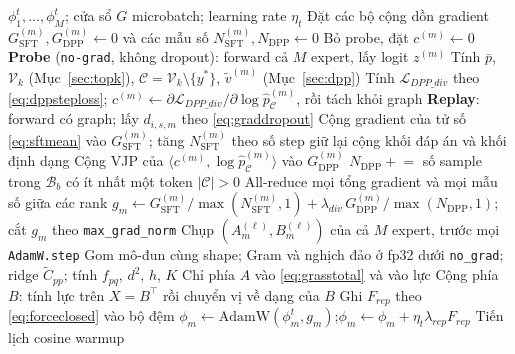 \documentclass[12pt,a4paper]{article}
\theoremstyle{plain}
\newcommand{\Vk}{\mathcal V_k}
\newcommand{\Cset}{\mathcal C}
\newcommand{\ytar}{y^{*}}
\begin{document}
\begin{algorithm}[H]
\caption{Một bước optimizer của Phase 1 (chế độ probe)}
\label{alg:phase1step}
\begin{algorithmic}[1]
\Require $\phi_1^t,\dots,\phi_M^t$; cửa sổ $G$ microbatch; learning rate $\eta_t$
\State Đặt các bộ cộng dồn gradient $G^{(m)}_{\mathrm{SFT}},G^{(m)}_{\mathrm{DPP}}\leftarrow0$ và các mẫu số $N^{(m)}_{\mathrm{SFT}},N_{\mathrm{DPP}}\leftarrow0$
        \State Bỏ probe, đặt $c^{(m)}\leftarrow0$
    \Else
        \State \textbf{Probe} (\texttt{no-grad}, không dropout): forward cả $M$ expert, lấy logit $z^{(m)}$
        \State Tính $\bar p$, $\Vk$ (Mục~\ref{sec:topk}), $\Cset=\Vk\setminus\{\ytar\}$, $\tilde v^{(m)}$ (Mục~\ref{sec:dpp})
        \State Tính $\mathcal L_{DPP\_div}$ theo \eqref{eq:dppsteploss}; $c^{(m)}\leftarrow\partial\mathcal L_{DPP\_div}/\partial\log\hat p^{(m)}_{\Cset}$, rồi tách khỏi graph
    \EndIf
        \State \textbf{Replay}: forward có graph; lấy $d_{i,s,m}$ theo \eqref{eq:graddropout}
        \State Cộng gradient của tử số \eqref{eq:sftmean} vào $G^{(m)}_{\mathrm{SFT}}$; tăng $N^{(m)}_{\mathrm{SFT}}$ theo số step giữ lại cộng khối đáp án và khối định dạng
        \State Cộng VJP của $\langle c^{(m)},\log\hat p^{(m)}_{\Cset}\rangle$ vào $G^{(m)}_{\mathrm{DPP}}$
    \EndFor
    \State $N_{\mathrm{DPP}}\mathrel{+}=$ số sample trong $\mathcal B_b$ có ít nhất một token $|\Cset|>0$
\EndFor
\State All-reduce mọi tổng gradient và mọi mẫu số giữa các rank
\State $g_m\leftarrow G^{(m)}_{\mathrm{SFT}}/\max(N^{(m)}_{\mathrm{SFT}},1)+\lambda_{div}\,G^{(m)}_{\mathrm{DPP}}/\max(N_{\mathrm{DPP}},1)$; cắt $g_m$ theo \texttt{max\_grad\_norm}
    \State Chụp $(A_m^{(\ell)},B_m^{(\ell)})$ của cả $M$ expert, trước mọi \texttt{AdamW.step}
    \State Gom mô-đun cùng shape; Gram và nghịch đảo ở fp32 dưới \texttt{no\_grad}; ridge $\tilde C_{pp}$; tính $f_{pq}$, $d^2$, $h$, $K$
        \State Chỉ phía $A$ vào \eqref{eq:grasstotal} và vào lực
    \Else
        \State Cộng phía $B$: tính lực trên $X=B^\top$ rồi chuyển vị về dạng của $B$
    \EndIf
    \State Ghi $F_{rep}$ theo \eqref{eq:forceclosed} vào bộ đệm
\EndIf
{}
    \State $\phi_m\leftarrow\mathrm{AdamW}(\phi_m^t,g_m)$;\quad $\phi_m\leftarrow\phi_m+\eta_t\lambda_{rep}F_{rep}$
\EndFor
\State Tiến lịch cosine warmup
\end{algorithmic}
\end{algorithm}
\end{document}
